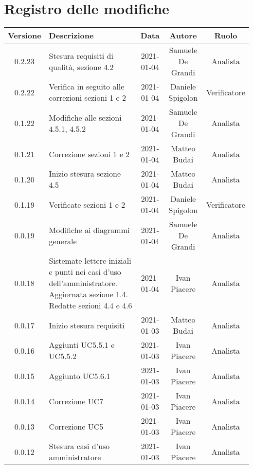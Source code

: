 \section*{Registro delle modifiche}

\begin{center}
	\begin{longtable}{|c|p{5cm}|c|c|c|}
		\hline
		\rowcolor{lighter-grayer}
		\textbf{Versione} & \textbf{Descrizione} & \textbf{Data} & \textbf{Autore} & \textbf{Ruolo} \\
		\hline
		\endfirsthead
		
		0.2.23 & Stesura requisiti di qualità, sezione 4.2  & 2021-01-04 & Samuele De Grandi & Analista \\
		\hline
		0.2.22 & Verifica in seguito alle correzioni sezioni 1 e 2   & 2021-01-04 & Daniele Spigolon & Verificatore \\
		\hline
		0.1.22 & Modifiche alle sezioni 4.5.1, 4.5.2   & 2021-01-04 & Samuele De Grandi & Analista \\
		\hline
		0.1.21 & Correzione sezioni 1 e 2 & 2021-01-04 & Matteo Budai & Analista \\
		\hline
		0.1.20 & Inizio stesura sezione 4.5 & 2021-01-04 & Matteo Budai & Analista \\
		\hline
		0.1.19 & Verificate sezioni 1 e 2 & 2021-01-04 & Daniele Spigolon & Verificatore \\
		\hline
		0.0.19 & Modifiche ai diagrammi generale  & 2021-01-04 & Samuele De Grandi & Analista \\
		\hline
		0.0.18 & Sistemate lettere iniziali e punti nei casi d'uso dell'amministratore. Aggiornata sezione 1.4. Redatte sezioni 4.4 e 4.6 & 2021-01-04 & Ivan Piacere & Analista \\
		\hline
		0.0.17 & Inizio stesura requisiti & 2021-01-03 & Matteo Budai & Analista \\
		\hline
		0.0.16 & Aggiunti UC5.5.1 e UC5.5.2 & 2021-01-03 & Ivan Piacere & Analista \\
		\hline
		0.0.15 & Aggiunto UC5.6.1 & 2021-01-03 & Ivan Piacere & Analista \\
		\hline
		0.0.14 & Correzione UC7 & 2021-01-03 & Ivan Piacere & Analista \\
		\hline
		0.0.13 & Correzione UC5 & 2021-01-03 & Ivan Piacere & Analista \\
		\hline
		0.0.12 & Stesura casi d'uso amministratore & 2021-01-03 & Ivan Piacere & Analista \\

\end{longtable}
\end{center}
